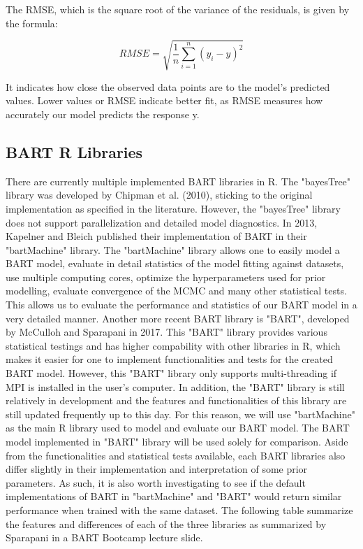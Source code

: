 \documentclass{usiinftr}
\begin{document}
The RMSE, which is the square root of the variance of the residuals, is given by the formula: 

\begin{equation}
R M S E=\sqrt{\frac{1}{n} \sum_{i=1}^{n}\left(y_{i}-\hat{y}\right)^{2}}
\end{equation}

It indicates how close the observed data points are to the model's predicted values. Lower values or RMSE indicate better fit, as RMSE measures how accurately our model predicts the response y.  

\subsection{BART R Libraries}
There are currently multiple implemented BART libraries in R. The "bayesTree" library was developed by Chipman et al. (2010), sticking to the original implementation as specified in the literature. However, the "bayesTree" library does not support parallelization and detailed model diagnostics. In 2013, Kapelner and Bleich published their implementation of BART in their "bartMachine" library. The "bartMachine" library allows one to easily model a BART model, evaluate in detail statistics of the model fitting against datasets, use multiple computing cores, optimize the hyperparameters used for prior modelling, evaluate convergence of the MCMC and many other statistical tests. This allows us to evaluate the performance and statistics of our BART model in a very detailed manner. Another more recent BART library is "BART", developed by McCulloh and Sparapani in 2017. This "BART" library provides various statistical testings and has higher compability with other libraries in R, which makes it easier for one to implement functionalities and tests for the created BART model. However, this "BART" library only supports multi-threading if MPI is installed in the user's computer. In addition, the "BART" library is still relatively in development and the features and functionalities of this library are still updated frequently up to this day. For this reason, we will use "bartMachine" as the main R library used to model and evaluate our BART model. The BART model implemented in "BART" library will be used solely for comparison. Aside from the functionalities and statistical tests available, each BART libraries also differ slightly in their implementation and interpretation of some prior parameters. As such, it is also worth investigating to see if the default implementations of BART in "bartMachine" and "BART" would return similar performance when trained with the same dataset. The following table summarize the features and differences of each of the three libraries as summarized by Sparapani in a BART Bootcamp lecture slide.
\end{document}
